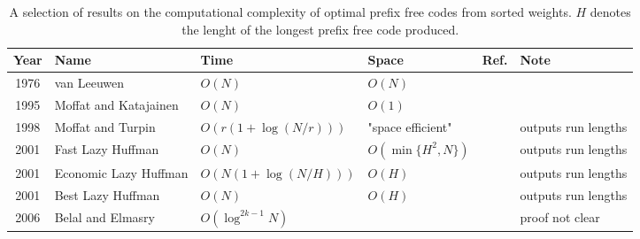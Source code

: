 \documentclass{llncs}
\begin{document}
\begin{LONG}
\begin{table}
\centering
\begin{tabular}{cp{4cm}p{4cm}p{2.5cm}p{1cm}p{3.5cm}}
Year & Name                  & Time                          & Space              & Ref.                                                                                                                              & Note        \\
\hline
1976 & van Leeuwen           & $O(N)$                        & $O(N)$             & \cite{1976-ICALP-OnTheConstructionOfHuffmanTrees-Leeuwen}                                                                         & \\
\hline
1995 & Moffat and Katajainen & $O(N)$                        & $O(1)$             & \cite{1995-WADAS-InPlaceCalculationOfMinimumRedundancyCodes-MoffatKatajainen}                                                     & \\
\hline
1998 & Moffat and Turpin     & $O(r(1+\log(N/r)))$           & "space efficient"  & \cite{1998-TIT-EfficientConstructionOfMinimumRedundancyCodesForLargeAlphabets-MoffatTurpin}                                       & outputs run lengths \\
\hline
2001 & Fast Lazy Huffman     & $O(N)$                        & $O(\min\{H^2,N\})$ & \cite{2001-IEEE-ThreeSpaceEconomicalAlgorithmsForCalculatingMinimumRedundancyPrefixCodes-MilidiuPessoaLaber}                      & outputs run lengths \\
2001 & Economic Lazy Huffman & $O(N(1+\log(N/H)))$           & $O(H)$             & \cite{2001-IEEE-ThreeSpaceEconomicalAlgorithmsForCalculatingMinimumRedundancyPrefixCodes-MilidiuPessoaLaber}                      & outputs run lengths \\
2001 & Best Lazy Huffman     & $O(N)$                        & $O(H)$             & \cite{2001-IEEE-ThreeSpaceEconomicalAlgorithmsForCalculatingMinimumRedundancyPrefixCodes-MilidiuPessoaLaber}                      & outputs run lengths \\
\hline
2006 & Belal and Elmasry     & $O(\log^{2k-1} N)$            &                    & \cite{2006-STACS-DistributionSensitiveConstructionOfMinimumRedundancyPrefixCodes-BelalElmasry}                                    & proof not clear \\
\hline
\end{tabular}
\caption{A selection of results on the computational complexity of optimal prefix free codes from sorted weights. $H$ denotes the lenght of the longest prefix free code produced. 
}
\end{table}
\end{LONG}
\end{document}
